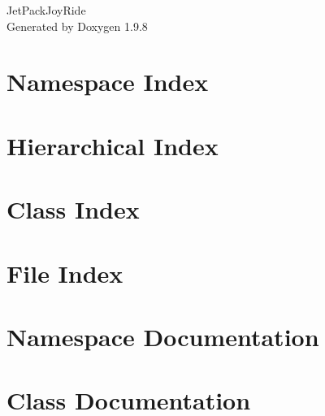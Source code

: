 \documentclass[twoside]{book}
\newcommand{\+}{\discretionary{\mbox{\scriptsize$\hookleftarrow$}}{}{}}
\newcommand{\clearemptydoublepage}{%
    \newpage{\pagestyle{empty}\cleardoublepage}%
  }
\begin{document}
  \raggedbottom
    \hypersetup{pageanchor=false,
                bookmarksnumbered=true,
                pdfencoding=unicode
               }
  \begin{titlepage}
  \vspace*{7cm}
  \begin{center}%
  {\Large Jet\+Pack\+Joy\+Ride}\\
  \vspace*{1cm}
  {\large Generated by Doxygen 1.9.8}\\
  \end{center}
  \end{titlepage}
  \clearemptydoublepage
  \tableofcontents
  \clearemptydoublepage
  \hypersetup{pageanchor=true}

\chapter{Namespace Index}

\chapter{Hierarchical Index}

\chapter{Class Index}

\chapter{File Index}

\chapter{Namespace Documentation}

\chapter{Class Documentation}



































\end{document}
